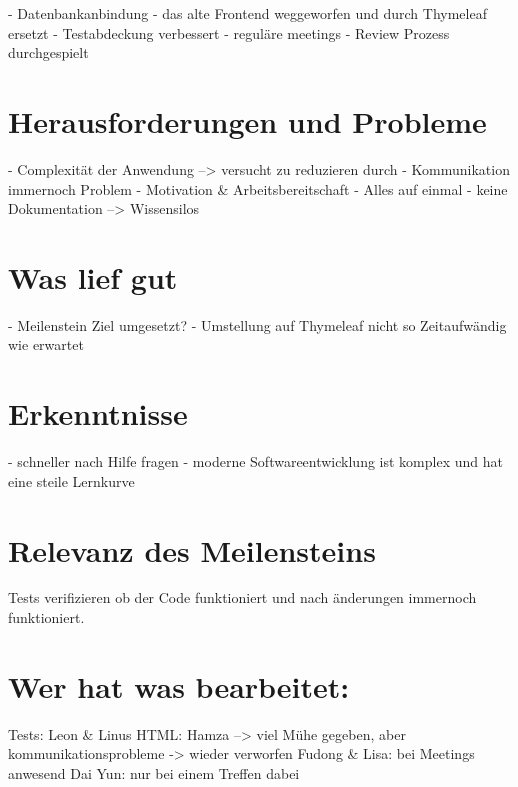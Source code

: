 \documentclass[a4paper, 12pt, oneside, BCOR1cm,toc=chapterentrywithdots]{scrbook}
\begin{document}
- Datenbankanbindung
- das alte Frontend weggeworfen und durch Thymeleaf ersetzt 
- Testabdeckung verbessert
- reguläre meetings
- Review Prozess durchgespielt

\section*{Herausforderungen und Probleme}

- Complexität der Anwendung --> versucht zu reduzieren durch
- Kommunikation immernoch Problem
- Motivation & Arbeitsbereitschaft
- Alles auf einmal
- keine Dokumentation --> Wissensilos

\section*{Was lief gut}

- Meilenstein Ziel umgesetzt?
- Umstellung auf Thymeleaf nicht so Zeitaufwändig wie erwartet

\section*{Erkenntnisse}

- schneller nach Hilfe fragen
- moderne Softwareentwicklung ist komplex und hat eine steile Lernkurve

\section*{Relevanz des Meilensteins}

Tests verifizieren ob der Code funktioniert und nach änderungen immernoch funktioniert.

\section*{Wer hat was bearbeitet:}

Tests: Leon & Linus
HTML: Hamza --> viel Mühe gegeben, aber kommunikationsprobleme -> wieder verworfen
Fudong & Lisa: bei Meetings anwesend
Dai Yun: nur bei einem Treffen dabei
\end{document}
